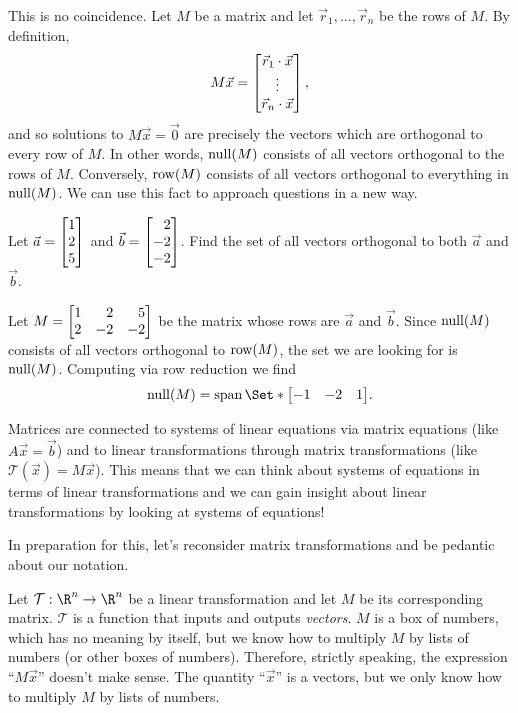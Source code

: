 This is no coincidence. Let $M$ be a matrix and let $\vec r_1,\ldots,\vec r_n$ be the rows of $M$. By definition,
\[
	M\vec x=\begin{bmatrix}\vec r_1\cdot \vec x\\\vdots\\\vec r_n\cdot \vec x\end{bmatrix},
\]
and so solutions to $M\vec x=\vec 0$ are precisely the vectors which are orthogonal to every row of $M$. In other words,
$\operatorname{null}(M)$ consists of all vectors orthogonal to the rows of $M$.
Conversely, $\operatorname{row}(M)$ consists of all vectors orthogonal to everything in $\operatorname{null}(M)$. We can use this
fact to approach questions in a new way.

\begin{example}
	Let $\vec a=\mat{1\\2\\5}$ and $\vec b=\mat{2\\-2\\-2}$. Find the set of all vectors orthogonal
	to both $\vec a$ and $\vec b$.

	Let $M=\mat{1&2&5\\2&-2&-2}$ be the matrix whose rows are $\vec a$ and $\vec b$. Since
	$\operatorname{null}(M)$ consists of all vectors orthogonal to $\operatorname{row}(M)$, the set we are looking for is
	$\operatorname{null}(M)$. Computing via row reduction we find
	\[
		\Null(M)=\Span\Set*{\mat{-1&-2&1}}.
	\]
\end{example}




Matrices are connected to systems of linear equations via matrix equations (like $A\vec x=\vec b$)
and to linear transformations through matrix transformations (like $\mathcal T(\vec x)=M\vec x$).
This means that we can think about systems of equations in terms of linear transformations and
we can gain insight about linear transformations by looking at systems of equations!

In preparation for this, let's reconsider matrix transformations and be pedantic about our notation.

Let $\mathcal T:\R^n\to\R^n$ be a linear transformation and let $M$ be its corresponding matrix.
$\mathcal T$ is a function that inputs and outputs \emph{vectors}. $M$ is a box of numbers,
which has no meaning by itself, but we know how to multiply $M$ by lists of numbers (or other boxes of numbers).
Therefore, strictly speaking, the expression ``$M\vec x$'' doesn't make sense. The quantity ``$\vec x$'' is a
vectors, but we only know how to multiply $M$ by lists of numbers.

